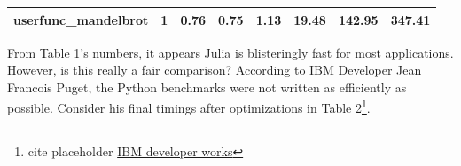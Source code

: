 \documentclass[10pt]{article}
\begin{document}
\begin{table}[]
\begin{tabular}{|l|c|c|c|c|c|c|c|}
\textbf{userfunc\_mandelbrot} & 1                                                                & 0.76                                                           & 0.75                                                                 & 1.13                                                              & 19.48                                                                 & 142.95                                                          & 347.41                                                     \\ \hline
\end{tabular}
\end{table}

From Table 1's numbers, it appears Julia is blisteringly fast for most applications. However, is this really a fair comparison? According to IBM Developer Jean Francois Puget, the Python benchmarks were not written as efficiently as possible. Consider his final timings after optimizations in Table 2\footnote{cite placeholder \href{https://www.ibm.com/developerworks/community/blogs/jfp/entry/Python_Meets_Julia_Micro_Performance?lang=en}{IBM developer works}}.
\end{document}
